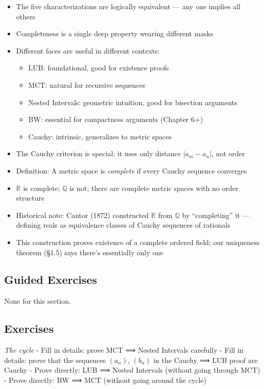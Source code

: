 \documentclass[
  10pt,
  letterpaper,
]{scrbook}
\providecommand{\tightlist}{%
  \setlength{\itemsep}{0pt}\setlength{\parskip}{0pt}}
\newcommand{\QQ}{\mathbb{Q}}
\newcommand{\RR}{\mathbb{R}}
\begin{document}
\begin{itemize}
\tightlist
\item
  The five characterizations are logically equivalent --- any one
  implies all others
\item
  Completeness is a single deep property wearing different masks
\item
  Different faces are useful in different contexts:

  \begin{itemize}
  \tightlist
  \item
    LUB: foundational, good for existence proofs
  \item
    MCT: natural for recursive sequences
  \item
    Nested Intervals: geometric intuition, good for bisection arguments
  \item
    BW: essential for compactness arguments (Chapter 6+)
  \item
    Cauchy: intrinsic, generalizes to metric spaces
  \end{itemize}
\item
  The Cauchy criterion is special: it uses only distance
  \(|a_m - a_n|\), not order
\item
  Definition: A metric space is \emph{complete} if every Cauchy sequence
  converges
\item
  \(\RR\) is complete; \(\QQ\) is not; there are complete metric spaces
  with no order structure
\item
  Historical note: Cantor (1872) constructed \(\RR\) from \(\QQ\) by
  ``completing'' it --- defining reals as equivalence classes of Cauchy
  sequences of rationals
\item
  This construction proves existence of a complete ordered field; our
  uniqueness theorem (§1.5) says there's essentially only one
\end{itemize}

\subsection{Guided Exercises}\label{guided-exercises-9}

None for this section.

\subsection{Exercises}\label{exercises-14}

\emph{The cycle} - Fill in details: prove MCT ⟹ Nested Intervals
carefully - Fill in details: prove that the sequences \((a_n)\),
\((b_n)\) in the Cauchy ⟹ LUB proof are Cauchy - Prove directly: LUB ⟹
Nested Intervals (without going through MCT) - Prove directly: BW ⟹ MCT
(without going around the cycle)
\end{document}
